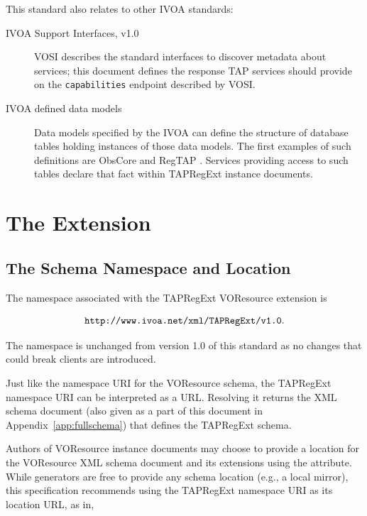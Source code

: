 \documentclass{ivoa}
\begin{document}
This standard also relates to other IVOA standards:


\begin{description}
\item[IVOA Support Interfaces, v1.0 \citep{std:VOSI}] \hfil\break VOSI describes the standard interfaces to discover metadata about
services; this document defines the response TAP services should
provide on the \texttt{capabilities} endpoint described by VOSI.
\item[IVOA defined data models]Data models specified by the IVOA can define the structure of
database tables holding instances of those data models.
The first examples of such definitions are ObsCore
\citep{std:OBSCORE} and RegTAP \citep{std:RegTAP}.  Services providing
access to such tables
declare that fact within TAPRegExt instance documents.

\end{description}


\section{The Extension}

\label{taextension}

\subsection{The Schema Namespace and Location}

\label{nsloc}

The namespace associated with the TAPRegExt VOResource extension is

$$
\mbox{\texttt{http://www.ivoa.net/xml/TAPRegExt/v1.0}.}
$$

The namespace is unchanged from version 1.0 of this standard as no
changes that could break clients are introduced.

Just like the namespace URI for the VOResource schema, the
TAPRegExt namespace URI can be interpreted as a URL.  Resolving it
returns the XML schema document (also given as a part of this document
in Appendix~\ref{app:fullschema})
that defines the TAPRegExt schema.

Authors of VOResource instance documents may choose to
provide a location for the VOResource XML schema document and its
extensions using the
 attribute.  
While generators are
free to provide any schema location (e.g., a local mirror), this specification
recommends using the TAPRegExt namespace URI as its location URL,
as in,
\end{document}
